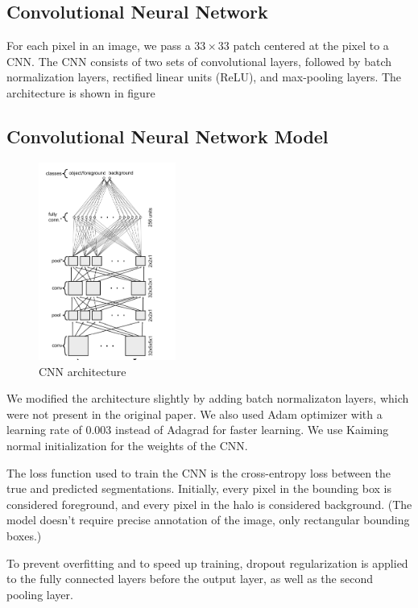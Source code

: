 \documentclass[a4paper]{article}
\begin{document}
\subsection{Convolutional Neural Network}
For each pixel in an image, we pass a $33 \times 33$ patch centered at the pixel
to a CNN. The CNN consists of two sets of convolutional layers, followed by
batch normalization layers, rectified linear units (ReLU), and max-pooling
layers. The architecture is shown in figure %

\subsection{Convolutional Neural Network Model}
\begin{figure}[h!]
    \centering
    \includegraphics[width=0.4\textwidth]{figures/Screenshot from 2024-04-27 19-52-38.png}
    \caption{CNN architecture}
\end{figure}

We modified the architecture slightly by adding batch normalizaton layers,
which were not present in the original paper. We also used Adam optimizer with a
learning rate of 0.003 instead of Adagrad for faster learning. We use Kaiming
normal \cite{kaiming} initialization for the weights of the CNN.

The loss function used to train the CNN is the cross-entropy loss between the
true and predicted segmentations. Initially, every pixel in the bounding box is
considered foreground, and every pixel in the halo is considered background.
(The model doesn't require precise annotation of the image, only rectangular
bounding boxes.)

To prevent overfitting and to speed up
training, dropout regularization \cite{dropout} is applied to the fully
connected layers before the output layer, as well as the second pooling layer.
\end{document}
